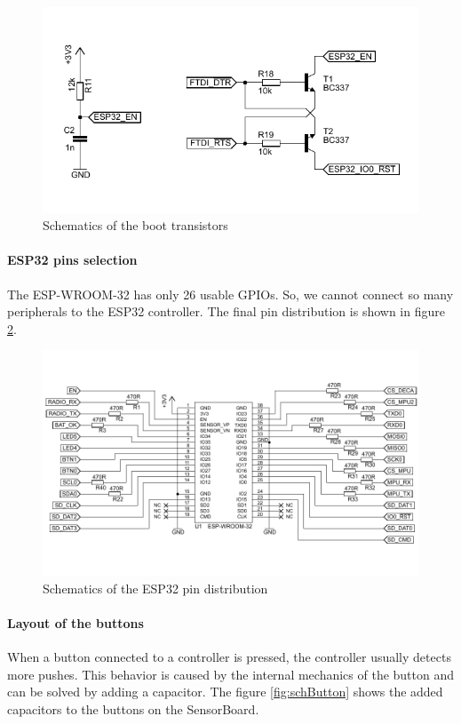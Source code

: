 \begin{figure}
    \centering
    \label{fig:schBoot}
    \caption{Schematics of the boot transistors}
    \includegraphics[scale=1.3]{img/SchBoot.pdf}
\end{figure}

\paragraph{ESP32 pins selection}
The ESP-WROOM-32 \cite{espressif:ESP-WROOM-32} has only 26 usable \ac{GPIO}s. So, we cannot connect so many peripherals to the ESP32 controller. The final pin distribution is shown in figure \ref{fig:schPinout}.

\begin{figure}
    \centering
    \label{fig:schPinout}
    \caption{Schematics of the ESP32 pin distribution}
    \includegraphics[scale=1.3, angle=90]{img/SchPinout.pdf}
\end{figure}

\paragraph{Layout of the buttons}
When a button connected to a controller is pressed, the controller usually detects more pushes. This behavior is caused by the internal mechanics of the button and can be solved by adding a capacitor. The figure \ref{fig:schButton} shows the added capacitors to the buttons on the SensorBoard.

